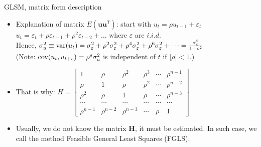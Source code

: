 \documentclass{beamer}
\begin{document}
\begin{frame}{GLSM, matrix form description}
\begin{itemize}
\item Explanation of matrix $E(\boldsymbol{uu}^T)$: start with $u_t = \rho u_{t-1}+ \varepsilon_t$\\
$u_t= \varepsilon_t + \rho \varepsilon_{t-1} + \rho^2 \varepsilon_{t-2} + \dots$ \qquad where $\varepsilon$ are $i.i.d.$\\
Hence, $\sigma^2_u \equiv \textnormal{var}(u_t)= 
\sigma^2_{\varepsilon} + \rho^2 \sigma^2_{\varepsilon} + \rho^4 \sigma^2_{\varepsilon} 
+ \rho^6 \sigma^2_{\varepsilon} + \dots
= \frac{\sigma^2_{\varepsilon}}{1-\rho^2}$\\
(Note: $\textnormal{cov}(u_t,u_{t+s})=\rho^s \sigma^2_u$ is independent of $t$ if $|\rho|<1$.)\\
\vspace{0.3cm}
\item That is why: 
$H=\begin{bmatrix}
    1&  \rho & \rho^2 & \rho^3 & \cdots & \rho^{n-1}\\
    \rho &  1&  \rho & \rho^2 & \cdots & \rho^{n-2} \\ 
    \rho^2 &  \rho &  1& \rho  & \cdots & \rho^{n-3} \\ 
    \cdots & \cdots & \cdots & \cdots & \cdots & \cdots \\
     \rho^{n-1} & \rho^{n-2} & \rho^{n-3} & \cdots & \rho & 1
\end{bmatrix}$
\vspace{0.3cm}
\item Usually, we do not know the matrix $\boldsymbol{H}$, it must be estimated. In such case, we call the method Feasible General Least Squares (FGLS).
\end{itemize}
\end{frame}
\end{document}
